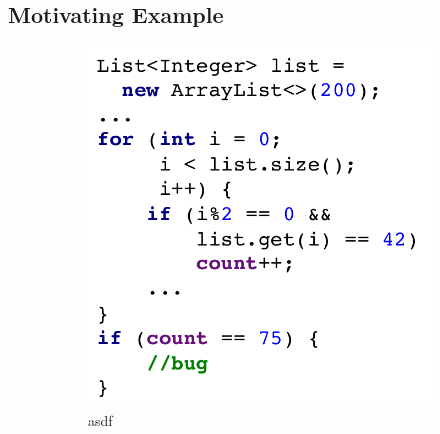 \subsection{Motivating Example}
\begin{figure}[h]
 \centering
 \begin{subfigure}[b]{0.48\textwidth}
  \centering
  \includegraphics[width=\textwidth]{figures/example.pdf}
  \caption{asdf}
 \end{subfigure}\hfill%
 \begin{subfigure}[b]{0.48\textwidth}
  \centering

\end{subfigure}
\end{figure}
